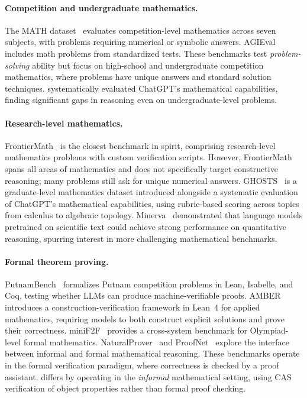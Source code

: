 \paragraph{Competition and undergraduate mathematics.}
The MATH dataset~\citep{hendrycks2021measuring} evaluates competition-level mathematics across seven subjects, with problems requiring numerical or symbolic answers.
AGIEval~\citep{zhong2023agieval} includes math problems from standardized tests.
These benchmarks test \emph{problem-solving} ability but focus on high-school and undergraduate competition mathematics, where problems have unique answers and standard solution techniques.
\citet{frieder2023mathematical} systematically evaluated ChatGPT's mathematical capabilities, finding significant gaps in reasoning even on undergraduate-level problems.

\paragraph{Research-level mathematics.}
FrontierMath~\citep{glazer2024frontiermath} is the closest benchmark in spirit, comprising research-level mathematics problems with custom verification scripts.
However, FrontierMath spans all areas of mathematics and does not specifically target constructive reasoning; many problems still ask for unique numerical answers.
GHOSTS~\citep{frieder2023mathematical} is a graduate-level mathematics dataset introduced alongside a systematic evaluation of ChatGPT's mathematical capabilities, using rubric-based scoring across topics from calculus to algebraic topology.
Minerva~\citep{lewkowycz2022minerva} demonstrated that language models pretrained on scientific text could achieve strong performance on quantitative reasoning, spurring interest in more challenging mathematical benchmarks.

\paragraph{Formal theorem proving.}
PutnamBench~\citep{tsoukalas2024putnambench} formalizes Putnam competition problems in Lean, Isabelle, and Coq, testing whether LLMs can produce machine-verifiable proofs.
AMBER~\citep{yang2026amber} introduces a construction-verification framework in Lean~4 for applied mathematics, requiring models to both construct explicit solutions and prove their correctness.
miniF2F~\citep{zheng2022minif2f} provides a cross-system benchmark for Olympiad-level formal mathematics.
NaturalProver~\citep{welleck2022naturalprover} and ProofNet~\citep{azerbayev2023proofnet} explore the interface between informal and formal mathematical reasoning.
These benchmarks operate in the formal verification paradigm, where correctness is checked by a proof assistant.
\ecagbench{} differs by operating in the \emph{informal} mathematical setting, using CAS verification of object properties rather than formal proof checking.

